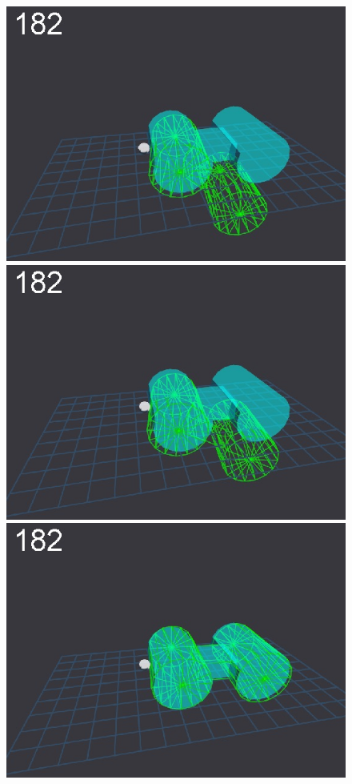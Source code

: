 \begin{figure}[t]
{}
\centerline{
\includegraphics[width=\imgCXwid]{./C5_1exp_6_3}
\includegraphics[width=\imgCXwid]{./C5_2exp_6_3}
\includegraphics[width=\imgCXwid]{./C5_3exp_6_3}
}
\end{figure}
